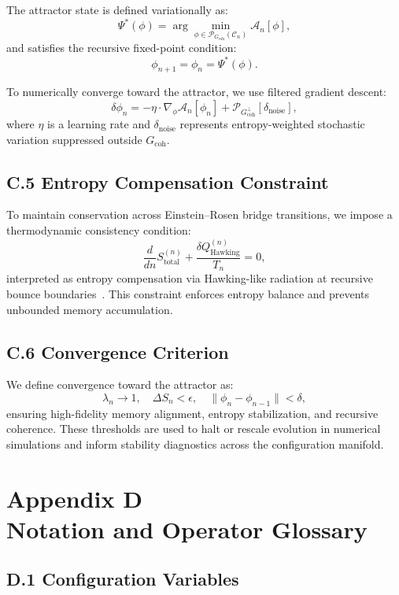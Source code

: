 \documentclass[11pt]{article}
\begin{document}
The attractor state is defined variationally as:
\[
\Psi^*(\phi) = \arg \min_{\phi \in \mathcal{P}_{G_{\text{coh}}}(\mathcal{C}_n)} \mathcal{A}_n[\phi],
\]
and satisfies the recursive fixed-point condition:
\[
\phi_{n+1} = \phi_n = \Psi^*(\phi).
\]

To numerically converge toward the attractor, we use filtered gradient descent:
\[
\delta \phi_n = -\eta \cdot \nabla_{\phi} \mathcal{A}_n[\phi_n] + \mathcal{P}_{G_{\text{coh}}^\perp} \left[ \delta_{\text{noise}} \right],
\]
where $\eta$ is a learning rate and $\delta_{\text{noise}}$ represents entropy-weighted stochastic variation suppressed outside $G_{\text{coh}}$.

\subsection*{C.5 Entropy Compensation Constraint}

To maintain conservation across Einstein–Rosen bridge transitions, we impose a thermodynamic consistency condition:
\[
\frac{d}{dn} S_{\text{total}}^{(n)} + \frac{\delta Q_{\text{Hawking}}^{(n)}}{T_n} = 0,
\]
interpreted as entropy compensation via Hawking-like radiation at recursive bounce boundaries~\cite{verlinde2011emergent}. This constraint enforces entropy balance and prevents unbounded memory accumulation.

\subsection*{C.6 Convergence Criterion}

We define convergence toward the attractor as:
\[
\lambda_n \to 1, \quad \Delta S_n < \epsilon, \quad \|\phi_n - \phi_{n-1}\| < \delta,
\]
ensuring high-fidelity memory alignment, entropy stabilization, and recursive coherence. These thresholds are used to halt or rescale evolution in numerical simulations and inform stability diagnostics across the configuration manifold.



\section*{Appendix D\\Notation and Operator Glossary}
\label{appendix:D}

\subsection*{D.1 Configuration Variables}
\end{document}
